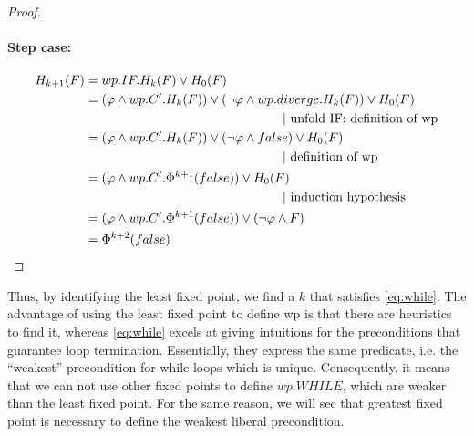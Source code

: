 \begin{proof}
\vspace{-0.25cm}\paragraph{Step case: } 
  \begin{align*} 
    H_{k+1}(F)     & = wp.IF.H_{k}(F) \vee H_0(F) \\
                  & = (\varphi\wedge wp.C'.H_{k}(F))\vee(\neg\varphi\wedge wp.diverge.H_{k}(F)) \vee H_0(F) \\ 
                  &\hspace{0.45\textwidth} | \ \text{unfold IF; definition of wp} \\
                  & = (\varphi\wedge wp.C'.H_{k}(F))\vee(\neg\varphi\wedge false) \vee H_0(F) \\
                  &\hspace{0.45\textwidth} | \ \text{definition of wp} \\
                  & = (\varphi\wedge wp.C'.\Phi^{k+1}(false)) \vee H_0(F)  \\
                  &\hspace{0.45\textwidth} | \ \text{induction hypothesis} \\
                  & = (\varphi\wedge wp.C'.\Phi^{k+1}(false)) \vee (\neg\varphi\wedge F)  \\
                  & = \Phi^{k+2}(false)  \\
  \end{align*}

\end{proof}

Thus, by identifying the least fixed point, we find a $k$ that satisfies \autoref{eq:while}.
The advantage of using the least fixed point to define wp is that there are heuristics to find it, whereas \autoref{eq:while} excels at giving intuitions for the preconditions that guarantee loop termination. 
Essentially, they express the same predicate, i.e. the ``weakest'' precondition for while-loops which is unique. 
Consequently, it means that we can not use other fixed points to define $wp.WHILE$, which are weaker than the least fixed point. 
For the same reason, we will see that greatest fixed point is necessary to define the weakest liberal precondition. 


